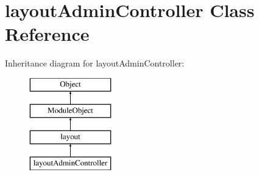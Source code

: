 \hypertarget{classlayoutAdminController}{}\section{layout\+Admin\+Controller Class Reference}
\label{classlayoutAdminController}
Inheritance diagram for layout\+Admin\+Controller\+:\begin{figure}[H]
\begin{center}
\leavevmode
\includegraphics[height=4.000000cm]{classlayoutAdminController}
\end{center}
\end{figure}
